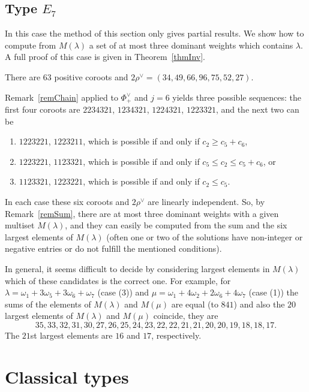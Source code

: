 \documentclass[11pt,a4paper]{article}
\theoremstyle{plain}
\theoremstyle{definition}
\begin{document}
\subsection{Type $E_7$}\label{secE7}

In this case the method of this section only gives partial results. We
show how to compute from $M(\lambda)$ a set of at most three dominant
weights which contains $\lambda$. A full proof of this case is given in
Theorem~\ref{thmInv}.

There are $63$  positive coroots 
and $2\rho^\vee = (34, 49, 66, 96, 75, 52, 27)$.

Remark~\ref{remChain} applied to $\Phi^\vee_+$ and $j = 6$ yields
three possible sequences: the first four coroots are $2234321$, $1234321$,
$1224321$, $1223321$, and the next two can be
\begin{enumerate}
\item[(1)] $1223221$, $1223211$, which is possible if and only if 
$c_2 \geq c_5 + c_6$,
\item[(2)] $1223221$, $1123321$, which is possible if and only if 
$c_5 \leq c_2 \leq c_5 + c_6$, or
\item[(3)] $1123321$, $1223221$, which is possible if and only if 
$c_2 \leq c_5$.
\end{enumerate}
In each case these six coroots and $2\rho^\vee$ are linearly independent.
So, by Remark~\ref{remSum}, there are at most three dominant weights with a
given multiset $M(\lambda)$, and they can easily be computed from the sum
and the six largest elements of $M(\lambda)$ (often one or two of the
solutions have non-integer or negative entries or do not fulfill the
mentioned conditions).

In general, it seems difficult to decide by considering largest elements
in $M(\lambda)$ which of these
candidates is the correct one. For example, for $\lambda = \omega_1 +
3\omega_5 + 3\omega_6 + \omega_7$ (case (3)) and $\mu = \omega_1 +
4\omega_2 + 2\omega_6 + 4\omega_7$ (case (1)) the sums of the elements of
$M(\lambda)$ and $M(\mu)$ are equal (to $841$) and also the $20$ largest
elements of $M(\lambda)$ and $M(\mu)$ coincide, they are
\[ 35, 33, 32, 31, 30, 27, 26, 25, 24, 23, 22, 22, 21, 21, 20, 20, 19, 18,
18, 17. \]
The $21$st largest elements are $16$ and $17$, respectively. 



\section{Classical types}\label{secClassical}
\end{document}
